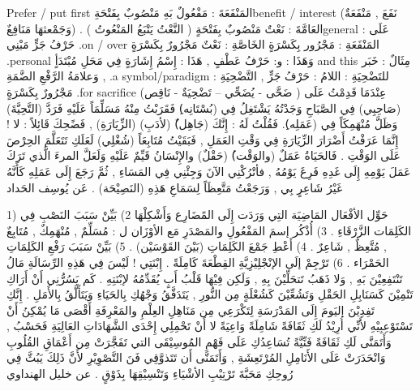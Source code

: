\documentclass[a4paper]{article}
\begin{document}
\begin{flushright}
‏Prefer / put first
المَنْفَعَةَ : مَفْعُولٌ بَهِ مَنْصُوبٌ بِفَتْحَةِbenefit / interest
            (نَفَعَ , مَنْفَعَةٌ وَجَمْعثهَا مَنَافِعٌ) .
العَامَّةَ : نَعْتٌ مَنْصُوبٌ بِفَتْحَةٍ ( النَّعْتُ يَتْبَعُ المَنْعُوتُ )general
عَلَى : حَرْفُ جَرٍّ مَبْنِي .on / over
المَنْفَعَةِ : مَجْرُور بِكَسْرَةٍ
الخَاصَّةِ : نَعْتٌ مَجْرُورٌ بِكَسْرَةٍ .personal
وَهَذَا : و: حَرْفُ عَطْفٍ , هَذَا : إِسْمُ إِشَارَةٍ فِي مَحَلِ مُبْتَدَأٍ and this
مِثَالٌ : خَبَر , وَعلامَةُ الرَّفْعِ الضَّمَةِ .a symbol/paradigm
للتَضْحِيَةِ : اللامُ : حَرْفُ جَرٍّ , التَّضْحِيَةِ : مَجْرُورٌ بِكَسْرَةٍ .for sacrifice
(ضَحَّى - يُضَحِّي – تَضْحِيَةٌ - نَاقِص )
عِنْدَمَا قَدِمْتُ عَلَى (صَاحِبِي) فِي الصَّبَاحِ وَجَدْتُهُ يَشْتَغِلُ فِي
(بُسْتَانِه)ِ فَقَرَبْتُ مِنْهُ مَسَلِّمَاً عَلَيْهِ فَرَدَّ (التَّحِيَّةَ) وَظَلَّ مُنْهَمِكَاً فِي
(عَمَلِه)ِ. فَقُلْتُ لَهُ : إِنَّكَ (جَاهِل)ٌ (لأدَبِ) (الزِّيَارَةِ) , فَضًحِكَ
قَائِلاً : لا ! إِنَّمَا عَرَفْتُ أَضْرَارَ الزِّيَارَةِ فِي وَقْتِ العَمَلِ ,
فَبَقَيْتُ مُتَابِعَاً (شُغْلِي) لَعَلَكِ تَتَعَلَّمَ الحِرْصَ عَلَى الوَقْتِ . فَالحَيَاةُ
عَمَلٌ (والوَقْت)ُ (حَقْلٌ) والإِنْسَانُ قَيِّمٌ عَلَيْهِ وَلَعَلَّ المرءَ الَّذي
تَرَكَ عَمَلَ يَوْمِهِ إِلَى غَدِهِ فَرِغَ يَوْمُهُ , فأتْرُكْنِي الآنَ وَجِئْنِي فِي
المَسَاءِ , ثُمَّ رَجَعَ إِلَى عَمَلِهِ كَأَنَّهُ غَيْرُ شَاعِرٍ بِي , وَرَجَعْتُ
مَتَّعِظَاً لِسَمَاعِ هَذِهِ (النَصِيْحَة) .
                                عَن يُوسِف الحَداد


1) حَوِّل الأفْعَال المَاضِيَة التِي وَرَدَت إِلَى المًضَارِع وَأَشْكِلْهَا
2)          بَيِّنْ سَبَبَ النَصْبِ فِي الكَلِمَات الزَّرْقَاءِ .
3)     أُذْكُر إسمَ المَفْعُولِ والمَصْدَرِ مَع الأوْزَان ل :
مُسَلِّمٌ , مُنْهَمِكٌ , مُتَابِعٌ , مُتَّعِظٌ , شَاعِرٌ .
4)          أَعْطِ جَمْعَ الكَلِمَاتِ (بَيْنَ القَوْسَيْن) .
5)          بَيِّنْ سَبَبَ رَفْعِ الكَلِمَاتِ الحَمْرَاء .
6)          تَرْجِمْ إلَى الإنْجْلِيْزِيَّةِ القِطْعَةَ كَامِلَةً .
إِبْنَتِي ! لَيْسَ فِي هَذِهِ الرِّسَالَةِ مَالُ تَنْتَفِعِيْنَ بَهِ , وَلا ذَهَبُ
تَتحَلِّيْنَ بِهِ , وَلَكِن فِيْهَا قَلْبُ أَبٍ يُقَدِّمُهُ لإبْنَتِهِ .
كَم يَسُرُّنِي أَنْ أَرَاكِ تَنْمِيْنَ كَسَنَابِلِ الحَقْلِ وَتَشُعِّيْنَ كَشُعْلَةٍ
مِن النُّورِ , يَتَدَفَّقُ وَجْهُكِ بِالحَيَاءِ وَيَتَأَلَّقُ بِالأَمَلِ . إِنَّكِ تَفِدِيْنَ
اليَومَ إِلَى المَدْرَسَةِ لِتَكْرَعِي مِن مَنَاهِلِ العِلْمِ والمَعْرِفَةِ أَقْصَى
مَا يُمْكِنُ أَنْ تَسْتَوْعِبِيْهِ لأَنِّي أُرِيْدُ لَكِ ثَقَافَةً شَامِلَةً وَاعِيَةً لا
أَنْ تَحْمِلِي إِحْدَى الشَّهَادَاتِ العَالِيَةِ فَحَسْبُ , وَأَتَمَنَّى لَكِ ثَقَافَةً
فَنِّيَّةً تُسَاعِدُكِ عَلَى فَهْمِ المُوسِيْقَى التي تَفَجَّرَتْ مِن أَعْمَاقِ
القُلُوبِ وَانْحَدَرَتْ عَلَى الأَنَامِلِ المُرْتَعِشَةِ , وَأَتَمَنَّى أَن تَتَذوَّقِي
فَنَ التَّصْوِيْرِ لأَنَّ ذَلِكَ يَبُثَّ فِي رُوحِكِ مَحَبَّةَ تَرْتِيْبِ الأشْيَاءِ
وَتَنْسِيْقِهَا بِذَوْقٍ .
                                عن خليل الهنداوي



\end{flushright}
\end{document}
